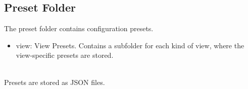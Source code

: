 \subsection{Preset Folder}
\label{sec:appendix_config_preset_folder}

The preset folder contains configuration presets.

\begin{itemize}
    \item view: View Presets. Contains a subfolder for each kind of view, where the view-specific presets are stored.
\end{itemize} \ \\

Presets are stored as JSON files.
